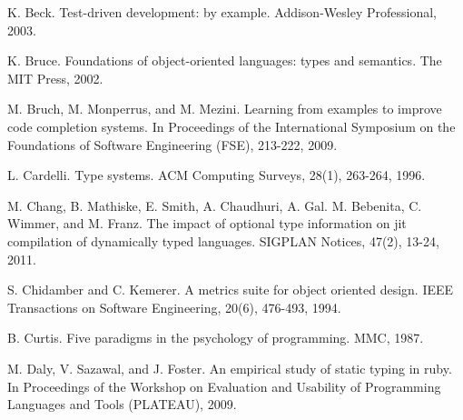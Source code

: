 \documentclass[msc]{ppgccufmg}
\begin{document}





\renewcommand{\bibfont}{\normalsize}
\begin{thebibliography}{}


K. Beck.  Test-driven development: by example. Addison-Wesley Professional, 2003.

K. Bruce. Foundations of object-oriented languages: types and semantics. The MIT Press, 2002.

M. Bruch, M. Monperrus, and M. Mezini. Learning from examples to improve code completion systems. In Proceedings of the International Symposium on the Foundations of Software Engineering (FSE), 213-222, 2009.

L. Cardelli. Type systems. ACM Computing Surveys, 28(1), 263-264, 1996.

M. Chang, B. Mathiske, E. Smith, A. Chaudhuri, A. Gal. M. Bebenita, C. Wimmer, and M. Franz. The impact of optional type information on jit compilation of dynamically typed languages. SIGPLAN Notices, 47(2), 13-24, 2011.

S. Chidamber and C. Kemerer. A metrics suite for object oriented design. IEEE Transactions on Software Engineering, 20(6), 476-493, 1994.


B. Curtis. Five paradigms in the psychology of programming. MMC, 1987.

M. Daly, V. Sazawal, and  J. Foster. An empirical study of static typing in ruby. In Proceedings of the Workshop on Evaluation and Usability of Programming Languages and Tools (PLATEAU), 2009.


\end{thebibliography}
\end{document}
